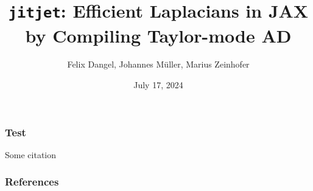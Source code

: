 \documentclass[12pt,usepdftitle=false,aspectratio=169]{beamer}
\title{%
  \texttt{jitjet}: Efficient Laplacians in JAX by Compiling Taylor-mode AD
}
\author{Felix Dangel, Johannes M\"uller, Marius Zeinhofer}
\date{July 17, 2024}
\begin{document}
\makeTitleSlide

\begin{frame}
  \frametitle{Test}
  Some citation \cite{li2023forward}
\end{frame}






\begin{frame}[allowframebreaks]
  \frametitle{References}

  {\footnotesize
    
    
  }
\end{frame}
\end{document}
